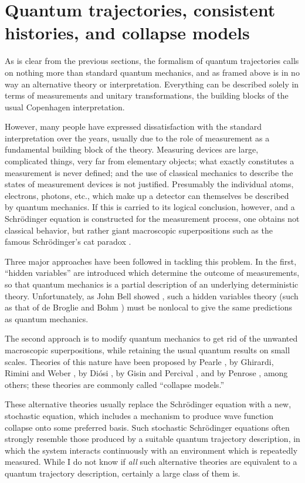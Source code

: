 \section{Quantum trajectories, consistent \\ histories, and collapse models}

As is clear from the previous sections, the formalism of quantum
trajectories calls on nothing more than standard quantum mechanics,
and as framed above is in no way an alternative theory or interpretation.
Everything can be described solely in terms of measurements and unitary
transformations, the building blocks of the usual Copenhagen interpretation.

However, many people have expressed dissatisfaction with the
standard interpretation over the years, usually due to
the role of measurement as a fundamental
building block of the theory.  Measuring devices are large, complicated
things, very far from elementary objects; what exactly constitutes a
measurement is never defined; and the use of classical mechanics to
describe the states of measurement devices is not justified.  Presumably
the individual atoms, electrons, photons, etc., which make up a detector
can themselves be described by quantum mechanics.  If this is carried to
its logical conclusion, however, and a Schr\"odinger equation is
constructed for the measurement process, one obtains not classical
behavior, but rather giant macroscopic superpositions such as the famous
Schr\"odinger's cat paradox \cite{Schroedinger}.

Three major approaches have been followed in tackling this problem.  In the
first, ``hidden variables'' are introduced which determine the outcome of
measurements, so that quantum mechanics is a partial description of an
underlying deterministic theory.  Unfortunately, as John Bell showed
\cite{Bell}, such a hidden variables theory
(such as that of de Broglie and Bohm \cite{Bohm}) must
be nonlocal to give the same predictions as quantum mechanics.

The second approach is to modify quantum mechanics to get rid of the
unwanted macroscopic superpositions, while retaining the usual quantum
results on small scales.  Theories of this nature have been proposed by
Pearle \cite{Pearle}, by Ghirardi, Rimini and Weber \cite{GRW},
by Di\'osi \cite{Diosi}, by Gisin \cite{Gisin1} and Percival \cite{Percival2},
and by Penrose \cite{Penrose}, among others; these theories are commonly
called ``collapse models.''

These alternative theories usually replace the Schr\"odinger equation
with a new, stochastic equation, which includes a mechanism to produce
wave function collapse onto some preferred basis.  Such stochastic
Schr\"odinger equations often strongly resemble those produced by a
suitable quantum trajectory description, in which the system interacts
continuously with an environment which is repeatedly measured.  While
I do not know if {\it all} such alternative theories are equivalent to a
quantum trajectory description, certainly a large class of them is.

